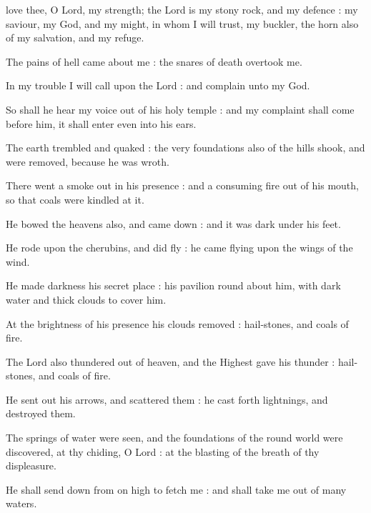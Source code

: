 

 love thee, O Lord, my strength; the Lord is my stony rock, and my defence : my saviour, my God, and my might, in whom I will trust, my buckler, the horn also of my salvation, and my refuge.\par
{}
The pains of hell came about me : the snares of death overtook me.\par
{}In my trouble I will call upon the Lord : and complain unto my God.\par
{}So shall he hear my voice out of his holy temple : and my complaint shall come before him, it shall enter even into his ears.\par
{}The earth trembled and quaked : the very foundations also of the hills shook, and were removed, because he was wroth.\par
{}There went a smoke out in his presence : and a consuming fire out of his mouth, so that coals were kindled at it.\par
{}He bowed the heavens also, and came down : and it was dark under his feet.\par
{}He rode upon the cherubins, and did fly : he came flying upon the wings of the wind.\par
{}He made darkness his secret place : his pavilion round about him, with dark water and thick clouds to cover him.\par
{}At the brightness of his presence his clouds removed : hail-stones, and coals of fire.\par
{}The Lord also thundered out of heaven, and the Highest gave his thunder : hail-stones, and coals of fire.\par
{}He sent out his arrows, and scattered them : he cast forth lightnings, and destroyed them.\par
{}The springs of water were seen, and the foundations of the round world were discovered, at thy chiding, O Lord : at the blasting of the breath of thy displeasure.\par
{}He shall send down from on high to fetch me : and shall take me out of many waters.\par
